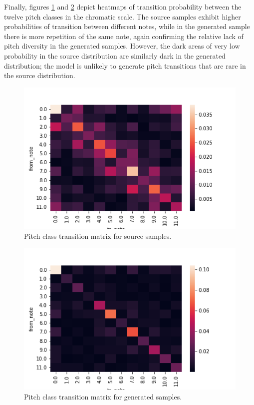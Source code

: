 \documentclass[sigconf,authorversion]{acmart}
\begin{document}
Finally, figures \ref{pctm_source} and \ref{pctm_generated} depict
heatmaps of transition probability between the twelve pitch classes in
the chromatic scale. The source samples exhibit higher probabilities
of transition between different notes, while in the generated sample
there is more repetition of the same note, again confirming the
relative lack of pitch diversity in the generated samples. However,
the dark areas of very low probability in the source distribution are
similarly dark in the generated distribution; the model is unlikely to
generate pitch transitions that are rare in the source distribution.

\begin{figure}[htbp]
  \centering
  \includegraphics[width=\linewidth]{figures/pctm_source.png}
  \caption{Pitch class transition matrix for source samples.}
  \label{pctm_source}
\end{figure}

\begin{figure}[htbp]
  \centering
  \includegraphics[width=\linewidth]{figures/pctm_generated.png}
  \caption{Pitch class transition matrix for generated samples.}
  \label{pctm_generated}
\end{figure}
\end{document}
